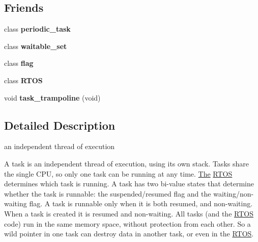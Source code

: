 \subsection*{Friends}
\begin{DoxyCompactItemize}
\item 
class {\bfseries periodic\+\_\+task}\hypertarget{class_r_t_o_s_1_1task_a01d2f5a71b8cd797b5f01fb6940ea353}{}\label{class_r_t_o_s_1_1task_a01d2f5a71b8cd797b5f01fb6940ea353}

\item 
class {\bfseries waitable\+\_\+set}\hypertarget{class_r_t_o_s_1_1task_a0ee29d8961a0b67cea2c3fa76da116da}{}\label{class_r_t_o_s_1_1task_a0ee29d8961a0b67cea2c3fa76da116da}

\item 
class {\bfseries flag}\hypertarget{class_r_t_o_s_1_1task_a2d8be07618a92a592c4905e969f9927f}{}\label{class_r_t_o_s_1_1task_a2d8be07618a92a592c4905e969f9927f}

\item 
class {\bfseries R\+T\+OS}\hypertarget{class_r_t_o_s_1_1task_aa5b30b5b619f01a5d94b779bf0e58610}{}\label{class_r_t_o_s_1_1task_aa5b30b5b619f01a5d94b779bf0e58610}

\item 
void {\bfseries task\+\_\+trampoline} (void)\hypertarget{class_r_t_o_s_1_1task_a972487b0f63ae9fefb7f6642dae2d452}{}\label{class_r_t_o_s_1_1task_a972487b0f63ae9fefb7f6642dae2d452}

\end{DoxyCompactItemize}


\subsection{Detailed Description}
an independent thread of execution 

A task is an independent thread of execution, using its own stack. Tasks share the single C\+PU, so only one task can be running at any time. \hyperlink{class_the}{The} \hyperlink{class_r_t_o_s}{R\+T\+OS} determines which task is running. A task has two bi-\/value states that determine whether the task is runnable\+: the suspended/resumed flag and the waiting/non-\/waiting flag. A task is runnable only when it is both resumed, and non-\/waiting. When a task is created it is resumed and non-\/waiting. All tasks (and the \hyperlink{class_r_t_o_s}{R\+T\+OS} code) run in the same memory space, without protection from each other. So a \textquotesingle{}wild pointer\textquotesingle{} in one task can destroy data in another task, or even in the \hyperlink{class_r_t_o_s}{R\+T\+OS}.

